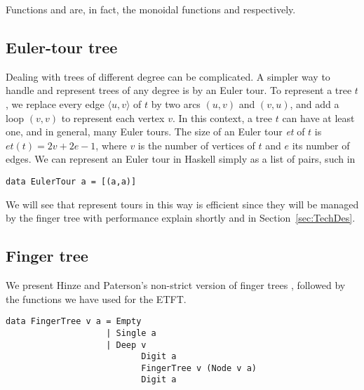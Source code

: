 Functions  and  are, in fact, the monoidal functions  and  respectively. 

\subsection{Euler-tour tree} 

Dealing with trees of different degree can be complicated. A simpler way to handle and represent trees of any degree is by an Euler tour. To represent a tree $t$, we replace every edge $\langle u,v \rangle$ of $t$ by two arcs $(u,v)$ and $(v,u)$, and add a loop $(v,v)$ to represent each vertex $v$. In this context, a tree $t$ can have at least one, and in general, many Euler tours. The size of an Euler tour \textit{et} of $t$ is $et(t) = 2v + 2e - 1$, where $v$ is the number of vertices of $t$ and $e$ its number of edges. We can represent an Euler tour in Haskell simply as a list of pairs, such in 

\begin{lstlisting}
data EulerTour a = [(a,a)] 
\end{lstlisting}

We will see that represent tours in this way is efficient since they will be managed by the finger tree with performance explain shortly and in Section~\ref{sec:TechDes}. 

\subsection{Finger tree} 

We present Hinze and Paterson's non-strict version of finger trees  \cite{FTs}, followed by the functions we have used for the ETFT.
\begin{lstlisting}
data FingerTree v a = Empty
                    | Single a 
                    | Deep v 
                           Digit a 
                           FingerTree v (Node v a) 
                           Digit a
\end{lstlisting}                           




